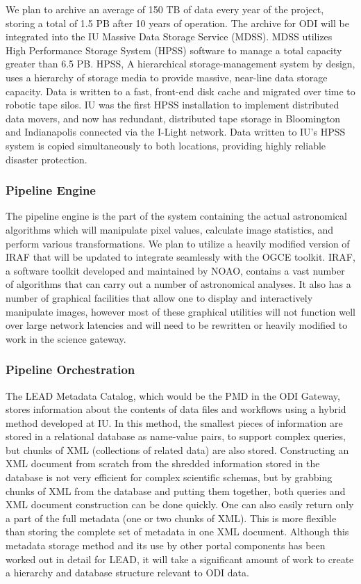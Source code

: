 \documentclass[10pt,conference]{IEEEtran}
\begin{document}
We plan to archive an average of 150 TB of data every year of the project, storing a total of 1.5 PB after 10 years of operation. The archive for ODI will be integrated into the IU Massive Data Storage Service (MDSS). MDSS utilizes High Performance Storage System (HPSS) software to manage a total capacity greater than 6.5 PB. HPSS, A hierarchical storage-management system by design, uses a hierarchy of storage media to provide massive, near-line data storage capacity. Data is written to a fast, front-end disk cache and migrated over time to robotic tape silos. IU was the first HPSS installation to implement distributed data movers, and now has redundant, distributed tape storage in Bloomington and Indianapolis connected via the I-Light network. Data written to IU's HPSS system is copied simultaneously to both locations, providing highly reliable disaster protection. 

\subsubsection{Pipeline Engine}

The pipeline engine is the part of the system containing the actual astronomical algorithms which will manipulate pixel values, calculate image statistics, and perform various transformations. We plan to utilize a heavily modified version of IRAF that will be updated to integrate seamlessly with the OGCE toolkit. IRAF, a software toolkit developed and maintained by NOAO, contains a vast number of algorithms that can carry out a number of astronomical analyses. It also has a number of graphical facilities that allow one to display and interactively manipulate images, however most of these graphical utilities will not function well over large network latencies and will need to be rewritten or heavily modified to work in the science gateway. 

\subsubsection{Pipeline Orchestration}

The LEAD Metadata Catalog, which would be the PMD in the ODI Gateway, stores information about the contents of data files and workflows using a hybrid method developed at IU. In this method, the smallest pieces of information are stored in a relational database as name-value pairs, to support complex queries, but chunks of XML (collections of related data) are also stored. Constructing an XML document from scratch from the shredded information stored in the database is not very efficient for complex scientific schemas, but by grabbing chunks of XML from the database and putting them together, both queries and XML document construction can be done quickly. One can also easily return only a part of the full metadata (one or two chunks of XML). 
This is more flexible than storing the complete set of metadata in one XML document.  
Although this metadata storage method and its use by other portal components has been worked out in detail for LEAD, it will take a significant amount of work to create a hierarchy and database structure relevant to ODI data. 
\end{document}
